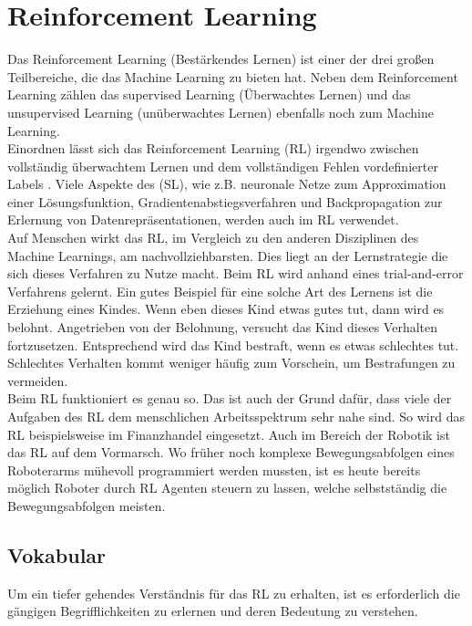 \section{Reinforcement Learning}
Das Reinforcement Learning (Bestärkendes Lernen) ist einer der drei großen Teilbereiche, die das Machine Learning zu bieten hat. Neben dem Reinforcement Learning zählen das supervised Learning (Überwachtes Lernen) und das unsupervised Learning (unüberwachtes Lernen) ebenfalls noch zum Machine Learning.\\
Einordnen lässt sich das Reinforcement Learning (RL) irgendwo zwischen vollständig überwachtem Lernen und dem vollständigen Fehlen vordefinierter Labels \cite[S. 26]{DRL_Lapan}. Viele Aspekte des (SL), wie z.B. neuronale Netze zum Approximation einer Lösungsfunktion, Gradientenabstiegsverfahren und Backpropagation zur Erlernung von Datenrepräsentationen, werden auch im RL verwendet.\\
Auf Menschen wirkt das RL, im Vergleich zu den anderen Disziplinen des Machine Learnings, am nachvollziehbarsten. Dies liegt an der Lernstrategie die sich dieses Verfahren zu Nutze macht. Beim RL wird anhand eines 
\grqq trial-and-error\glqq{} Verfahrens gelernt. Ein gutes Beispiel für eine solche Art des Lernens ist die Erziehung eines Kindes. Wenn eben dieses Kind etwas gutes tut, dann wird es belohnt. Angetrieben von der Belohnung, versucht das Kind dieses Verhalten fortzusetzen. Entsprechend wird das Kind bestraft, wenn es etwas schlechtes tut. Schlechtes Verhalten kommt weniger häufig zum Vorschein, um Bestrafungen zu vermeiden. \cite[S.1 ff.]{Sutton1998}\\
Beim RL funktioniert es genau so. Das ist auch der Grund dafür, dass viele der Aufgaben des RL dem menschlichen Arbeitsspektrum sehr nahe sind. So wird das RL beispielsweise im Finanzhandel eingesetzt. Auch im Bereich der Robotik ist das RL auf dem Vormarsch. Wo früher noch komplexe Bewegungsabfolgen eines Roboterarms mühevoll programmiert werden mussten, ist es heute bereits möglich Roboter durch RL Agenten steuern zu lassen, welche selbstständig die Bewegungsabfolgen meisten. \cite[Kapitel 18]{DRL_Lapan}

\subsection{Vokabular} \label{sec:Vokabular}
Um ein tiefer gehendes Verständnis für das RL zu erhalten, ist es erforderlich die gängigen Begrifflichkeiten zu erlernen und deren Bedeutung zu verstehen.

